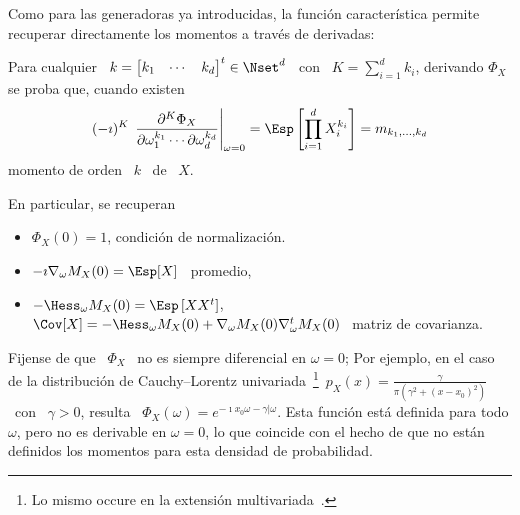 Como para las generadoras ya introducidas, la funci\'on caracter\'istica permite
recuperar directamente los momentos a trav\'es de derivadas:
%
\begin{lema}
\label{Lem:MP:GeneracionMomentoViaCaracteristica}
%
  Para cualquier \  $k = \begin{bmatrix} k_1 & \cdots  & k_d \end{bmatrix}^t \in
  \Nset^d$ \  con \  $K =  \sum_{i=1}^d k_i$, derivando  $\Phi_X$ se  proba que,
  cuando existen
  \[
  (-   \imath)^K  \,   \left.\frac{\partial^K   \Phi_X}{\partial  \omega_1^{k_1}
      \cdots    \partial    \omega_d^{k_d}}\right|_{\omega=0}    =    \Esp\left[
    \prod_{i=1}^d X_i^{k_i} \right] = m_{k_1,\ldots,k_d}
  \]
  momento de orden \ $k$ \ de \ $X$.
\end{lema}
%
En particular, se recuperan
%
\begin{itemize}
\item $\Phi_X(0) = 1$, condici\'on de normalizaci\'on.
%
\item $- \imath \nabla_\omega M_X(0) = \Esp[X]$ \ promedio,
%
\item  $- \Hess_\omega  M_X(0) =  \Esp\left[ X  X^t \right]$,  \ie $\Cov[X]  = -
  \Hess_\omega M_X(0) + \nabla_\omega M_X(0) \nabla_\omega^t M_X(0)$ \ matriz de
  covarianza.
\end{itemize}

Fijense de  que \  $\Phi_X$ \  no es siempre  diferencial en  $\omega =  0$; Por
ejemplo,    en   el    caso    de   la    distribuci\'on   de    Cauchy--Lorentz
univariada~\footnote{Lo      mismo       occure      en      la      extensi\'on
  multivariada~\cite{SamTaq94}.}\ $p_X(x) =  \frac{\gamma}{\pi \left( \gamma^2 +
    (x-x_0)^2  \right)}$ \  con  \ $\gamma  >  0$, resulta  \ $\Phi_X(\omega)  =
e^{-\imath x_0  \omega -\gamma |\omega}  $. Esta funci\'on est\'a  definida para
todo $\omega$,  pero no es  derivable en  $\omega = 0$,  lo que coincide  con el
hecho  de  que  no  est\'an   definidos  los  momentos  para  esta  densidad  de
probabilidad.

